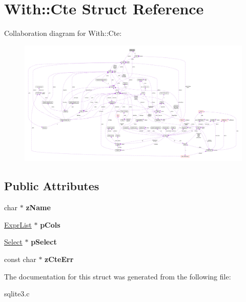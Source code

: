 \hypertarget{structWith_1_1Cte}{}\section{With\+:\+:Cte Struct Reference}
\label{structWith_1_1Cte}


Collaboration diagram for With\+:\+:Cte\+:\nopagebreak
\begin{figure}[H]
\begin{center}
\leavevmode
\includegraphics[width=350pt]{structWith_1_1Cte__coll__graph}
\end{center}
\end{figure}
\subsection*{Public Attributes}
\begin{DoxyCompactItemize}
\item 
char $\ast$ {\bfseries z\+Name}\hypertarget{structWith_1_1Cte_a3ce66361944f92f0d3fc354025320dd6}{}\label{structWith_1_1Cte_a3ce66361944f92f0d3fc354025320dd6}

\item 
\hyperlink{structExprList}{Expr\+List} $\ast$ {\bfseries p\+Cols}\hypertarget{structWith_1_1Cte_a9e43b7bf43ff5878c465f683fc464456}{}\label{structWith_1_1Cte_a9e43b7bf43ff5878c465f683fc464456}

\item 
\hyperlink{structSelect}{Select} $\ast$ {\bfseries p\+Select}\hypertarget{structWith_1_1Cte_a90fd9f2a4529a6fd1e75cabeccec16cd}{}\label{structWith_1_1Cte_a90fd9f2a4529a6fd1e75cabeccec16cd}

\item 
const char $\ast$ {\bfseries z\+Cte\+Err}\hypertarget{structWith_1_1Cte_a2e0558ed352afe93f08cb8a9ed407223}{}\label{structWith_1_1Cte_a2e0558ed352afe93f08cb8a9ed407223}

\end{DoxyCompactItemize}


The documentation for this struct was generated from the following file\+:\begin{DoxyCompactItemize}
\item 
sqlite3.\+c\end{DoxyCompactItemize}
